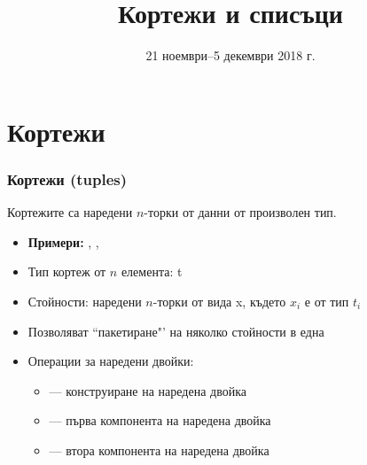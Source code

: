 \documentclass{beamer}
\title{Кортежи и списъци}
\date[21.11--5.12.2018 г.]{21 ноември--5 декември 2018 г.}
\begin{document}
\begin{frame}
  \titlepage
\end{frame}
\section{Кортежи}

\begin{frame}
  \frametitle{Кортежи (tuples)}

  Кортежите са наредени $n$-торки от данни от произволен тип.
  \begin{itemize}[<+->]
  \item \textbf{Примери:} , , 
  \item Тип кортеж от $n$ елемента: \tuple t
  \item Стойности: наредени $n$-торки от вида \tuple x, където $x_i$ е от тип $t_i$
  \item Позволяват ``пакетиране"' на няколко стойности в една
  \item Операции за наредени двойки:
    \begin{itemize}
    \item {} --- конструиране на наредена двойка
    \item {} --- първа компонента на наредена двойка
    \item {} --- втора компонента на наредена двойка
    \end{itemize}
  \end{itemize}
\end{frame}
\end{document}
